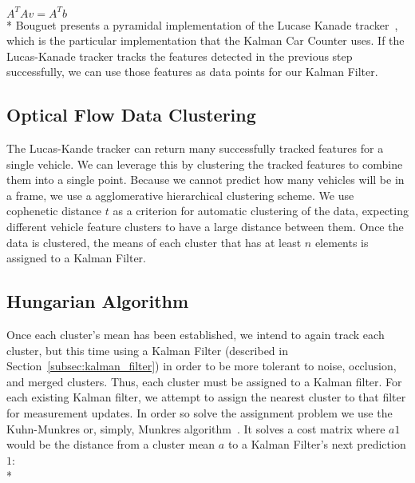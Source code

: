 \documentclass[draft]{article} %
\begin{document}
{\centering
$A^T A v=A^T b$\linebreak\newline\\*}
Bouguet presents a pyramidal implementation of the Lucase Kanade tracker~\cite{bouguet2001pyramidal}, which is the particular implementation that the Kalman Car Counter uses. If the Lucas-Kanade tracker tracks the features detected in the previous step successfully, we can use those features as data points for our Kalman Filter.

\subsection{Optical Flow Data Clustering}
\label{subsec:optical_flow}

The Lucas-Kande tracker can return many successfully tracked features for a single vehicle. We can leverage this by clustering the tracked features to combine them into a single point. Because we cannot predict how many vehicles will be in a frame, we use a agglomerative hierarchical clustering scheme. We use cophenetic distance $t$ as a criterion for automatic clustering of the data, expecting different vehicle feature clusters to have a large distance between them. Once the data is clustered, the means of each cluster that has at least $n$ elements is assigned to a Kalman Filter.

\subsection{Hungarian Algorithm}
\label{subsec:hungarian_algo}

Once each cluster's mean has been established, we intend to again track each cluster, but this time using a Kalman Filter (described in Section~\ref{subsec:kalman_filter}) in order to be more tolerant to noise, occlusion, and merged clusters. Thus, each cluster must be assigned to a Kalman filter. For each existing Kalman filter, we attempt to assign the nearest cluster to that filter for measurement updates. In order so solve the assignment problem we use the Kuhn-Munkres or, simply, Munkres algorithm~\cite{munkres1957algorithms}. It solves a cost matrix where $a1$ would be the distance from a cluster mean $a$ to a Kalman Filter's next prediction $1$:\\*
\end{document}
